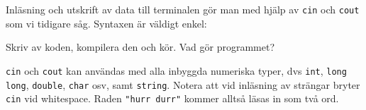 Inläsning och utskrift av data till terminalen gör man med hjälp av \texttt{cin} och \texttt{cout} som vi tidigare såg. Syntaxen är väldigt enkel:



Skriv av koden, kompilera den och kör. Vad gör programmet?

\texttt{cin} och \texttt{cout} kan användas med alla inbyggda numeriska typer, dvs \texttt{int}, \texttt{long long}, \texttt{double}, \texttt{char} osv, samt \texttt{string}. Notera att vid inläsning av strängar bryter \texttt{cin} vid whitespace. Raden \texttt{"hurr durr"} kommer alltså läsas in som två ord.
